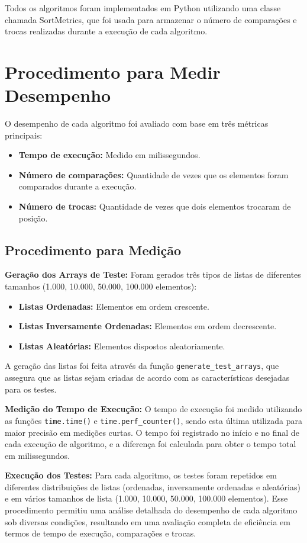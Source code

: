 \documentclass[12pt, a4paper]{report}
\begin{document}
Todos os algoritmos foram implementados em Python utilizando uma classe chamada SortMetrics, que foi usada para armazenar o número de comparações e trocas realizadas durante a execução de cada algoritmo.

\section{Procedimento para Medir Desempenho}
O desempenho de cada algoritmo foi avaliado com base em três métricas principais:
\begin{itemize}
    \item \textbf{Tempo de execução:} Medido em milissegundos.
    \item \textbf{Número de comparações:} Quantidade de vezes que os elementos foram comparados durante a execução.
    \item \textbf{Número de trocas:} Quantidade de vezes que dois elementos trocaram de posição.
\end{itemize}

\subsection*{Procedimento para Medição}

\textbf{Geração dos Arrays de Teste:} Foram gerados três tipos de listas de diferentes tamanhos (1.000, 10.000, 50.000, 100.000 elementos):
\begin{itemize}
    \item \textbf{Listas Ordenadas:} Elementos em ordem crescente.
    \item \textbf{Listas Inversamente Ordenadas:} Elementos em ordem decrescente.
    \item \textbf{Listas Aleatórias:} Elementos dispostos aleatoriamente.
\end{itemize}
A geração das listas foi feita através da função \texttt{generate\_test\_arrays}, que assegura que as listas sejam criadas de acordo com as características desejadas para os testes.

\textbf{Medição do Tempo de Execução:} O tempo de execução foi medido utilizando as funções \texttt{time.time()} e \texttt{time.perf\_counter()}, sendo esta última utilizada para maior precisão em medições curtas. O tempo foi registrado no início e no final de cada execução de algoritmo, e a diferença foi calculada para obter o tempo total em milissegundos.

\textbf{Execução dos Testes:} Para cada algoritmo, os testes foram repetidos em diferentes distribuições de listas (ordenadas, inversamente ordenadas e aleatórias) e em vários tamanhos de lista (1.000, 10.000, 50.000, 100.000 elementos). Esse procedimento permitiu uma análise detalhada do desempenho de cada algoritmo sob diversas condições, resultando em uma avaliação completa de eficiência em termos de tempo de execução, comparações e trocas.
\end{document}
